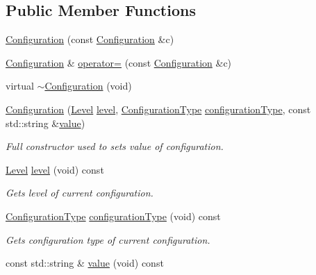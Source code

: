 \subsection*{Public Member Functions}
\begin{DoxyCompactItemize}
\item 
\hyperlink{classel_1_1_configuration_a71867a89e7d44cac62e0a436f01b484d}{Configuration} (const \hyperlink{classel_1_1_configuration}{Configuration} \&c)
\item 
\hyperlink{classel_1_1_configuration}{Configuration} \& \hyperlink{classel_1_1_configuration_a80bc5b14f61906633cf695ea62e454a2}{operator=} (const \hyperlink{classel_1_1_configuration}{Configuration} \&c)
\item 
virtual \hyperlink{classel_1_1_configuration_abaf0a9e1a96bd40800174982c983a4ac}{$\sim$\+Configuration} (void)
\item 
\hyperlink{classel_1_1_configuration_a1a00abf955e028debaaf7556a647dbf5}{Configuration} (\hyperlink{namespaceel_ab0ac6091262344c52dd2d3ad099e8e36}{Level} \hyperlink{classel_1_1_configuration_a66a96cf46d20204c50718f8a5e3622e2}{level}, \hyperlink{namespaceel_a281f5db6d6163678bc68a8b23b59e124}{Configuration\+Type} \hyperlink{classel_1_1_configuration_aab5091dcca176e309c0a2268ff55db0d}{configuration\+Type}, const std\+::string \&\hyperlink{classel_1_1_configuration_ab31605eb195a222cf32baa4922bb9a3c}{value})
\begin{DoxyCompactList}\small\item\em Full constructor used to sets value of configuration. \end{DoxyCompactList}\item 
\hyperlink{namespaceel_ab0ac6091262344c52dd2d3ad099e8e36}{Level} \hyperlink{classel_1_1_configuration_a66a96cf46d20204c50718f8a5e3622e2}{level} (void) const 
\begin{DoxyCompactList}\small\item\em Gets level of current configuration. \end{DoxyCompactList}\item 
\hyperlink{namespaceel_a281f5db6d6163678bc68a8b23b59e124}{Configuration\+Type} \hyperlink{classel_1_1_configuration_aab5091dcca176e309c0a2268ff55db0d}{configuration\+Type} (void) const 
\begin{DoxyCompactList}\small\item\em Gets configuration type of current configuration. \end{DoxyCompactList}\item 
const std\+::string \& \hyperlink{classel_1_1_configuration_ab31605eb195a222cf32baa4922bb9a3c}{value} (void) const 

\end{DoxyCompactItemize}
